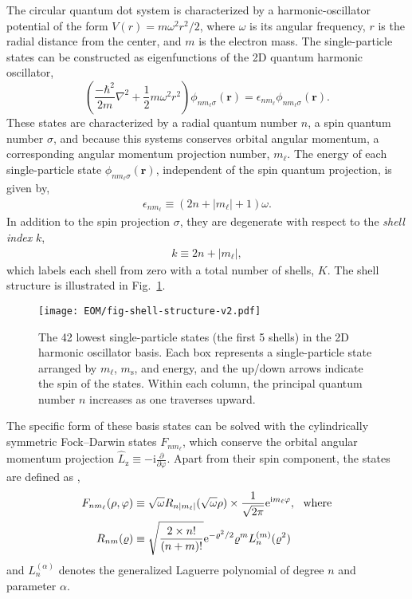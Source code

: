 \documentclass[thesis.tex]{subfiles}
\begin{document}
The circular quantum dot system is characterized by a harmonic-oscillator potential of the form $V(r) = m \omega^2r^2 / 2$, where $\omega$ is its angular frequency, $r$ is the radial distance from the center, and $m$ is the electron mass.  The single-particle states can be constructed as eigenfunctions of the 2D quantum harmonic oscillator,
\begin{equation} \label{eq:2d_ho}
  \left(\frac{-\hbar^{2}}{2m}\nabla^{2} + \frac{1}{2} m\omega^{2}r^{2}\right)\phi_{n m_{\ell} \sigma}(\mathbf{r}) = \epsilon_{n m_{\ell}}\phi_{n m_{\ell} \sigma}(\mathbf{r}).
\end{equation}
These states are characterized by a radial quantum number $n$, a spin quantum number $\sigma$, and because this systems conserves orbital angular momentum, a corresponding angular momentum projection number, $m_{\ell}$.  The energy of each single-particle state $\phi_{n m_{\ell} \sigma}(\mathbf{r})$, independent of the spin quantum projection, is given by,
\begin{align} \label{eq:energysingleparticlestate}
  \epsilon_{n m_{\ell}} \equiv (2 n + |m_\ell| + 1) \omega.
\end{align}
In addition to the spin projection $\sigma$, they are degenerate with respect to the \textit{shell index} $k$,
\begin{align} \label{eq:shell_index}
  k \equiv 2 n + |m_\ell|,
\end{align}
which labels each shell from zero with a total number of shells, $K$.  The shell structure is illustrated in Fig.\ \ref{fig:qd-shell-structure}.
\begin{figure}[h]
  \centering
  \texttt{[image: EOM/fig-shell-structure-v2.pdf]}
  \caption{The 42 lowest single-particle states (the first 5 shells) in the 2D harmonic oscillator basis.  Each box represents a single-particle state arranged by $m_\ell$, $m_{\mathrm{s}}$, and energy, and the up/down arrows indicate the spin of the states.  Within each column, the principal quantum number $n$ increases as one traverses upward.}
  \label{fig:qd-shell-structure}
\end{figure}

The specific form of these basis states can be solved with the cylindrically symmetric Fock--Darwin states $F_{n m_{\ell}}$, which conserve the orbital angular momentum projection $\hat{L}_{\mathrm{z}} \equiv -\mathrm{i} \frac{\partial}{\partial \varphi}$.  Apart from their spin component, the states are defined as \cite{LOHNE2010},
\begin{align}
  F_{n m_{\ell}}(\rho, \varphi) &\equiv \sqrt\omega R_{n |m_\ell|}(\sqrt \omega \rho) \times \frac{1}{\sqrt{2 \pi}} \mathrm{e}^{\mathrm{i} m_\ell \varphi} \label{eq:fockdarwin},\ \ \text{where} \\
  R_{n m}(\varrho) &\equiv \sqrt{\frac{2 \times n!}{(n + m)!}} \mathrm{e}^{-\varrho^2 / 2} \varrho^m L_n^{(m)}(\varrho^2) \notag
\end{align}
and $L_n^{(\alpha)}$ denotes the generalized Laguerre polynomial \cite{NIST:DLMF} of degree $n$ and parameter $\alpha$.
\end{document}
